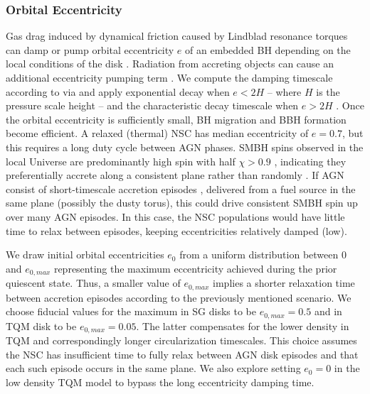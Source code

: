 \subsubsection{Orbital Eccentricity}
Gas drag induced by dynamical friction caused by Lindblad resonance torques \citep[referred to as Type I migration][]{GoldreichTremaine79,Ward97} can damp or pump orbital eccentricity $e$ of an embedded BH depending on the local conditions of the disk \citep{McKernan+12, Secunda+21, McKernanFord24, SzolgyenMacLeodLoeb22}.
Radiation from accreting objects can cause an additional eccentricity pumping term \citep{Cornejo+23}.
We compute the damping timescale according to \citet{TanakaWard04} via \citet{McKernanFord24} and apply \citet{PapaloizouLarwood00} exponential decay when $e<2H$ -- where $H$ is the pressure scale height -- and the characteristic decay timescale when $e>2H$ \citep{BitschKley10, Horn+12}.
Once the orbital eccentricity is sufficiently small, BH migration and BBH formation become efficient.
A relaxed (thermal) NSC has median eccentricity of $e=0.7$, but this requires a long duty cycle between AGN phases.
SMBH spins observed in the local Universe are predominantly high spin with half $\chi>0.9$ \citep{Reynolds19}, indicating they preferentially accrete along a consistent plane rather than randomly \citep{Volonteri+05}.
If AGN consist of short-timescale accretion episodes \citep{Schawinski+15,Shen21}, delivered from a fuel source in the same plane (possibly the dusty torus), this could drive consistent SMBH spin up over many AGN episodes.
In this case, the NSC populations would have little time to relax between episodes, keeping eccentricities relatively damped (low).

We draw initial orbital eccentricities $e_0$ from a uniform distribution between 0 and $e_{0,max}$ representing the maximum eccentricity achieved during the prior quiescent state.
Thus, a smaller value of $e_{0,max}$ implies a shorter relaxation time between accretion episodes according to the previously mentioned scenario.
We choose fiducial values for the maximum in SG disks to be $e_{0,max}=0.5$ and in TQM disk to be $e_{0,max}=0.05$.
The latter compensates for the lower density in TQM and correspondingly longer circularization timescales.
This choice assumes the NSC has insufficient time to fully relax between AGN disk episodes and that each such episode occurs in the same plane.
We also explore setting $e_0=0$ in the low density TQM model to bypass the long eccentricity damping time.

